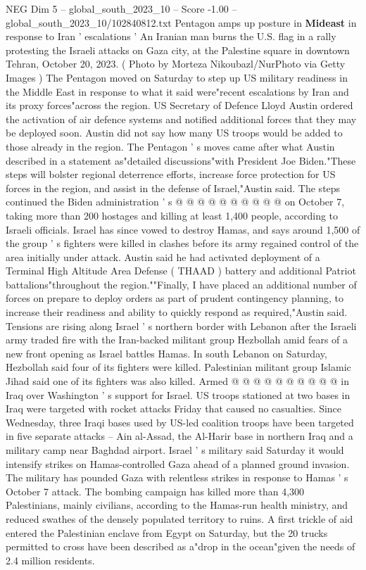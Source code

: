 \begin{textsample}{NEG Dim 5 – global\_south\_2023\_10 – Score -1.00 – global\_south\_2023\_10/102840812.txt}  \label{ex:f5_neg_090}
Pentagon amps up posture in \textbf{Mideast} in response to Iran ' escalations ' An Iranian man burns the U.S. flag in a rally protesting the Israeli attacks on Gaza city, at the Palestine square in downtown Tehran, October 20, 2023. ( Photo by Morteza Nikoubazl/NurPhoto via Getty Images ) The Pentagon moved on Saturday to step up US military readiness in the Middle East in response to what it said were"recent escalations by Iran and its proxy forces"across the region.
US Secretary of Defence Lloyd Austin ordered the activation of air defence systems and notified additional forces that they may be deployed soon.
Austin did not say how many US troops would be added to those already in the region.
The Pentagon ' s moves came after what Austin described in a statement as"detailed discussions"with President Joe Biden."These steps will bolster regional deterrence efforts, increase force protection for US forces in the region, and assist in the defense of Israel,"Austin said.
The steps continued the Biden administration ' s @ @ @ @ @ @ @ @ @ @ on October 7, taking more than 200 hostages and killing at least 1,400 people, according to Israeli officials.
Israel has since vowed to destroy Hamas, and says around 1,500 of the group ' s fighters were killed in clashes before its army regained control of the area initially under attack.
Austin said he had activated deployment of a Terminal High Altitude Area Defense ( THAAD ) battery and additional Patriot battalions"throughout the region.""Finally, I have placed an additional number of forces on prepare to deploy orders as part of prudent contingency planning, to increase their readiness and ability to quickly respond as required,"Austin said.
Tensions are rising along Israel ' s northern border with Lebanon after the Israeli army traded fire with the Iran-backed militant group Hezbollah amid fears of a new front opening as Israel battles Hamas.
In south Lebanon on Saturday, Hezbollah said four of its fighters were killed.
Palestinian militant group Islamic Jihad said one of its fighters was also killed.
Armed @ @ @ @ @ @ @ @ @ @ in Iraq over Washington ' s support for Israel.
US troops stationed at two bases in Iraq were targeted with rocket attacks Friday that caused no casualties.
Since Wednesday, three Iraqi bases used by US-led coalition troops have been targeted in five separate attacks -- Ain al-Assad, the Al-Harir base in northern Iraq and a military camp near Baghdad airport.
Israel ' s military said Saturday it would intensify strikes on Hamas-controlled Gaza ahead of a planned ground invasion.
The military has pounded Gaza with relentless strikes in response to Hamas ' s October 7 attack.
The bombing campaign has killed more than 4,300 Palestinians, mainly civilians, according to the Hamas-run health ministry, and reduced swathes of the densely populated territory to ruins.
A first trickle of aid entered the Palestinian enclave from Egypt on Saturday, but the 20 trucks permitted to cross have been described as a"drop in the ocean"given the needs of 2.4 million residents.

\end{textsample}
